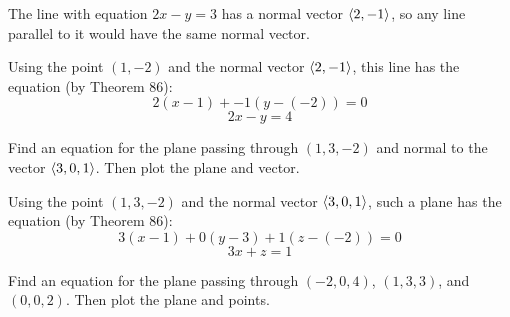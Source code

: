 \documentclass[letterpaper, twoside, 12pt]{book}
\begin{document}
          \begin{solution}
  The line with equation $2x-y=3$ has a normal vector $\langle2,-1\rangle$,
  so any line parallel to it would have the same normal vector.

  Using the point $(1,-2)$ and the normal vector $\langle2,-1\rangle$,
  this line has the equation (by Theorem 86):
  \[
    2(x-1) + -1(y-(-2)) = 0
  \]
  \[
    2x - y = 4
  \]
          \end{solution}

          \begin{problem}
            Find an equation for the plane passing through $(1,3,-2)$ and
            normal to the vector $\langle3,0,1\rangle$. Then plot the plane and vector.
          \end{problem}

          \begin{solution}
  Using the point $(1,3,-2)$ and the normal vector $\langle3,0,1\rangle$,
  such a plane has the equation (by Theorem 86):
  \[
    3(x-1) + 0(y-3) + 1(z-(-2)) = 0
  \]
  \[
    3x + z = 1
  \]
          \end{solution}

          \begin{problem}
            Find an equation for the plane passing through $(-2,0,4)$,
            $(1,3,3)$, and $(0,0,2)$. Then plot the plane and points.
          \end{problem}
\end{document}
